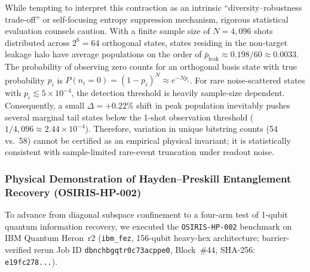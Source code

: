 \documentclass[aps,preprint,superscriptaddress,longbibliography]{revtex4-2}
\begin{document}
While tempting to interpret this contraction as an intrinsic ``diversity--robustness trade-off'' or self-focusing entropy suppression mechanism, rigorous statistical evaluation counsels caution. With a finite sample size of $N = 4{,}096$ shots distributed across $2^6 = 64$ orthogonal states, states residing in the non-target leakage halo have average populations on the order of $\bar{p}_{\mathrm{leak}} \approx 0.198 / 60 \approx 0.0033$. The probability of observing zero counts for an orthogonal basis state with true probability $p_i$ is $P(n_i = 0) = (1 - p_i)^N \approx e^{-N p_i}$. For rare noise-scattered states with $p_i \lesssim 5 \times 10^{-4}$, the detection threshold is heavily sample-size dependent. Consequently, a small $\Delta = +0.22\%$ shift in peak population inevitably pushes several marginal tail states below the 1-shot observation threshold ($1/4{,}096 \approx 2.44 \times 10^{-4}$). Therefore, variation in unique bitstring counts (54 vs.\ 58) cannot be certified as an empirical physical invariant; it is statistically consistent with sample-limited rare-event truncation under readout noise.

\subsubsection{Physical Demonstration of Hayden--Preskill Entanglement Recovery (OSIRIS-HP-002)}
\label{sec:hp_three_arm}

To advance from diagonal subspace confinement to a four-arm test of 1-qubit quantum information recovery, we executed the \texttt{OSIRIS-HP-002} benchmark on IBM Quantum Heron~r2 (\texttt{ibm\_fez}, 156-qubit heavy-hex architecture; barrier-verified rerun Job ID \texttt{dbnchbgqtr0c73acppe0}, Block~\#44, SHA-256: \texttt{e19fc278...}).
\end{document}
